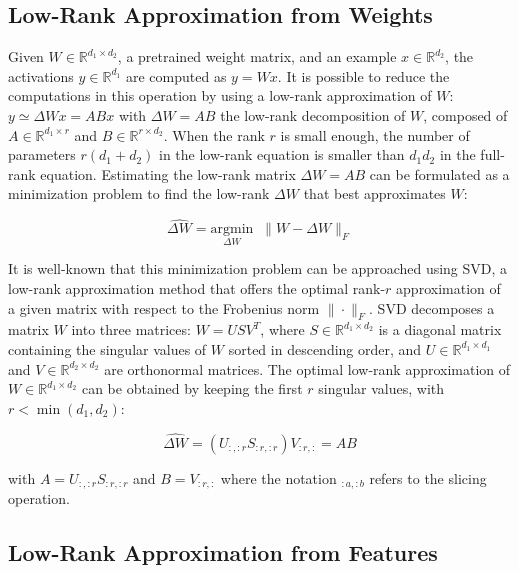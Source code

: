 \subsection{Low-Rank Approximation from Weights}
Given $W \in \mathbb{R}^{d_{1} \times d_{2}}$, a pretrained weight matrix, and an example $x \in \mathbb{R}^{d_{2}}$, the activations $y \in \mathbb{R}^{d_{1}}$ are computed as $y = Wx$. It is possible to reduce the computations in this operation by using a low-rank approximation of $W$: $y \simeq \Delta Wx = ABx$ with $\Delta W = AB$ the low-rank decomposition of $W$, composed of $A \in \mathbb{R}^{d_{1} \times r}$ and $B \in \mathbb{R}^{r \times d_{2}}$. When the rank $r$ is small enough, the number of parameters $r(d_1+d_2)$ in the low-rank equation is smaller than $d_1d_2$ in the full-rank equation. Estimating the low-rank matrix $\Delta W = AB$ can be formulated as a minimization problem to find the low-rank $\Delta W$ that best approximates $W$:

\begin{equation}
\widehat{\Delta W} = \underset{{\Delta W}}{\mathrm{argmin}} \;\; \|W - {\Delta W}\|_{F}
\end{equation}

It is well-known that this minimization problem can be approached using SVD, a low-rank approximation method that offers the optimal rank-$r$ approximation of a given matrix with respect to the Frobenius norm $\|\cdot\|_{F}$.
SVD decomposes a matrix $W$ into three matrices: $W = USV^{T}$, where $S\in \mathbb{R}^{d_{1} \times d_{2}}$ is a diagonal matrix containing the singular values of $W$ sorted in descending order, and $U \in \mathbb{R}^{d_{1} \times d_{1}}$ and $V \in \mathbb{R}^{d_{2} \times d_{2}}$ are orthonormal matrices. The optimal low-rank approximation of $W \in \mathbb{R}^{d_{1} \times d_{2}}$ can be obtained by keeping the first $r$ singular values, with $r < \min(d_{1}, d_{2})$:

\begin{equation}
\widehat{\Delta W} = (U_{:, :r}S_{:r, :r})V_{:r,:} = AB
\label{eq:svd}
\end{equation}

with $A=U_{:,:r}S_{:r,:r}$ and $B=V_{:r,:}$ where the notation $_{:a, :b}$ refers to the slicing operation.

\subsection{Low-Rank Approximation from Features}
\label{ssec:pca}


